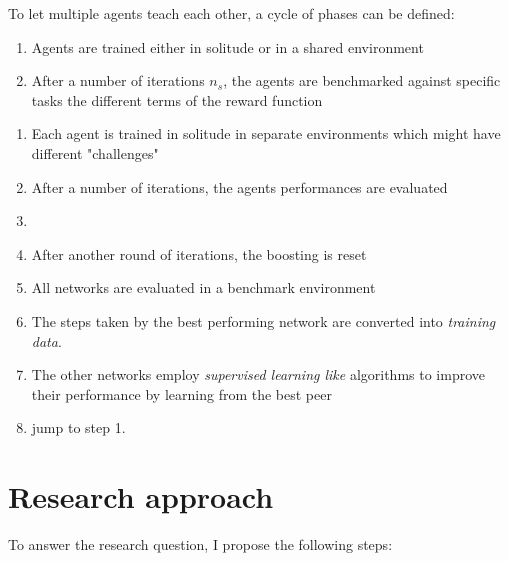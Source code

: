 \documentclass[12pt,a4paper]{article}
\begin{document}
To let multiple agents teach each other, a cycle of phases can be defined:

\begin{enumerate}
    \item Agents are trained either in solitude or in a shared environment
    \item  After a number of iterations $n_s$, the agents are benchmarked against specific tasks the different terms of the reward function
\end{enumerate}

\begin{enumerate}
    \item Each agent is trained in solitude in separate environments which might have different "challenges"
    \item  After a number of iterations, the agents performances are evaluated
    \item
    \item  After another round of iterations, the boosting is reset
    \item  All networks are evaluated in a benchmark environment
    \item  The steps taken by the best performing network are converted into \emph{training data}.
    \item  The other networks employ \emph{supervised learning like} algorithms to improve their performance by learning from the best peer
    \item  jump to step 1.
\end{enumerate}

\section{Research approach}


To answer the research question, I propose the following steps:
\end{document}
